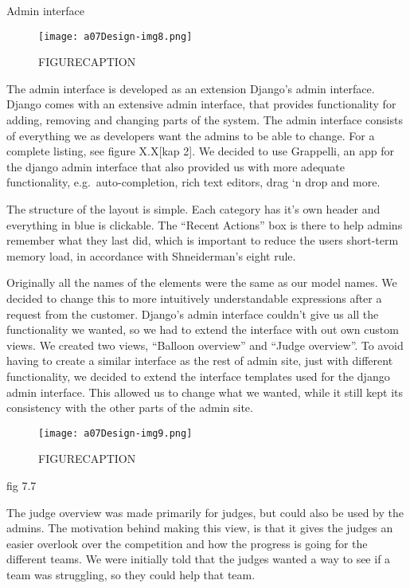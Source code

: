 Admin interface
 \begin{figure}[h!]
	\texttt{[image: a07Design-img8.png]} 
	\caption{FIGURECAPTION}
\end{figure}

The admin interface is developed as an extension
Django's admin interface. Django comes with an
extensive admin interface, that provides functionality for adding,
removing and changing parts of the system. The admin interface consists
of everything we as developers want the admins to be able to change.
For a complete listing, see figure X.X[kap 2]. We decided to use
Grappelli, an app for the django admin interface that also provided us
with more adequate functionality, e.g.\ auto-completion, rich text
editors, drag {\textquoteleft}n drop and more.

The structure of the layout is simple. Each category has
it's own header and everything in blue is clickable.
The ``Recent Actions'' box is there
to help admins remember what they last did, which is important to
reduce the users short-term memory load, in accordance with
Shneiderman's eight rule.

Originally all the names of the elements were the same as our model
names. We decided to change this to more intuitively understandable
expressions after a request from the customer. Django's
admin interface couldn't give us all the functionality
we wanted, so we had to extend the interface with out own custom views.
We created two views, ``Balloon overview'' and ``Judge overview''. 
To avoid having to create a similar interface as the rest of admin site,
just with different functionality, we decided to extend the interface 
templates used for the django admin interface. This allowed us to change 
what we wanted, while it still kept its consistency with the other parts 
of the admin site.



 \begin{figure}[h!]
	\texttt{[image: a07Design-img9.png]} 
	\caption{FIGURECAPTION}
\end{figure}
fig 7.7

The judge overview was made primarily for judges, but could also be used
by the admins. The motivation behind making this view, is that it gives
the judges an easier overlook over the competition and how the progress
is going for the different teams. We were initially told that the
judges wanted a way to see if a team was struggling, so they could help
that team.

